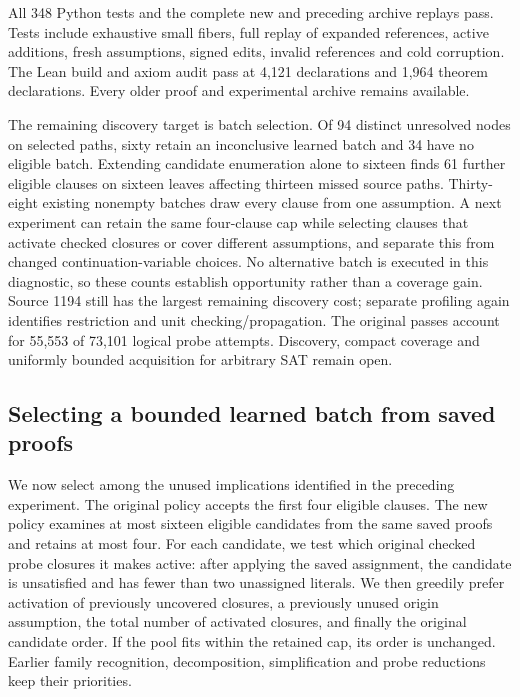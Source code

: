 \documentclass[11pt,a4paper]{article}
\numberwithin{equation}{section}
\theoremstyle{plain}
\theoremstyle{definition}
\theoremstyle{remark}
\begin{document}
All 348 Python tests and the complete new and preceding archive replays pass. Tests include exhaustive small fibers, full replay of expanded references, active additions, fresh assumptions, signed edits, invalid references and cold corruption. The Lean build and axiom audit pass at 4,121 declarations and 1,964 theorem declarations. Every older proof and experimental archive remains available.

The remaining discovery target is batch selection. Of 94 distinct unresolved nodes on selected paths, sixty retain an inconclusive learned batch and 34 have no eligible batch. Extending candidate enumeration alone to sixteen finds 61 further eligible clauses on sixteen leaves affecting thirteen missed source paths. Thirty-eight existing nonempty batches draw every clause from one assumption. A next experiment can retain the same four-clause cap while selecting clauses that activate checked closures or cover different assumptions, and separate this from changed continuation-variable choices. No alternative batch is executed in this diagnostic, so these counts establish opportunity rather than a coverage gain. Source 1194 still has the largest remaining discovery cost; separate profiling again identifies restriction and unit checking/propagation. The original passes account for 55,553 of 73,101 logical probe attempts. Discovery, compact coverage and uniformly bounded acquisition for arbitrary SAT remain open.

\subsection{Selecting a bounded learned batch from saved proofs}
\label{sec:learning-selection}

We now select among the unused implications identified in the preceding experiment. The original policy accepts the first four eligible clauses. The new policy examines at most sixteen eligible candidates from the same saved proofs and retains at most four. For each candidate, we test which original checked probe closures it makes active: after applying the saved assignment, the candidate is unsatisfied and has fewer than two unassigned literals. We then greedily prefer activation of previously uncovered closures, a previously unused origin assumption, the total number of activated closures, and finally the original candidate order. If the pool fits within the retained cap, its order is unchanged. Earlier family recognition, decomposition, simplification and probe reductions keep their priorities.
\end{document}
